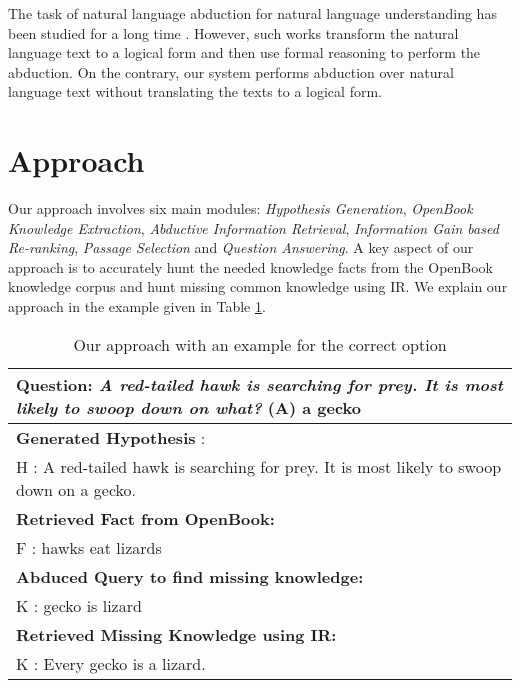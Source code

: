 \documentclass[11pt,a4paper]{article}
\begin{document}
The task of natural language abduction for natural language understanding has been studied for a long time \cite{norvig1983frame,norvig1987inference,hobbs2004abduction,hobbs1993interpretation,wilensky1983planning,wilensky2000berkeley,charniak1988logic,charniak1989semantics}. However, such works transform the natural language text to a logical form and then use formal reasoning to perform the abduction. On the contrary, our system performs abduction over natural language text without translating the texts to a logical form.

















\section{Approach}
Our approach involves six main modules: \textit{Hypothesis Generation}, \textit{OpenBook Knowledge Extraction}, \textit{Abductive Information Retrieval}, \textit{Information Gain based Re-ranking}, \textit{Passage Selection} and \textit{Question Answering}. A key aspect of our approach is to accurately hunt the needed knowledge facts from the OpenBook knowledge corpus and hunt missing common knowledge using IR. We explain our approach in the example given in Table \ref{tabgen}. 


\begin{table}[H]
\begin{center}
\begin{tabular}{|p{7cm}|}
\hline \textbf{Question:} \textit{A red-tailed hawk is searching for prey. It is most likely to swoop down on what?} (A)  \textbf{a gecko} \\  
\hline
\textbf{Generated Hypothesis} :\\
  H : A red-tailed hawk is searching for prey. It is most likely to swoop down on a gecko. \\
\hline
\textbf{Retrieved Fact from OpenBook:} \\
  F : hawks eat lizards \\
\hline
\textbf{Abduced  Query to find missing knowledge:} \\
  K : gecko is lizard \\
  \hline
  \textbf{Retrieved Missing Knowledge using IR:} \\
  K : Every gecko is a lizard.\\
  \hline
\end{tabular}
\end{center}
\caption{\label{tabgen} Our approach with an example for the correct option}
\end{table}
\end{document}
